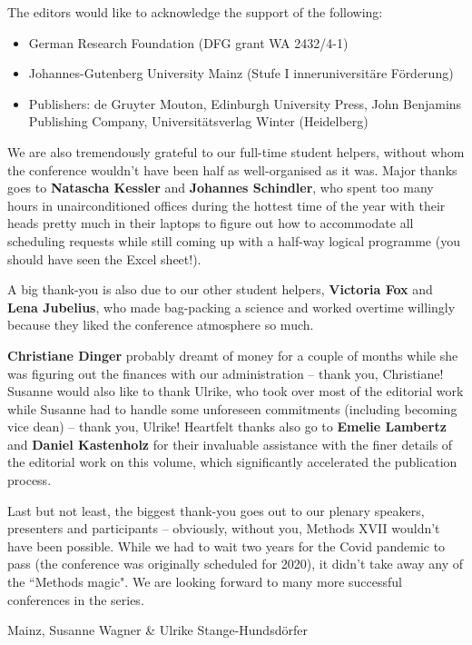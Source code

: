 \addchap{\lsAcknowledgementTitle}
\largerpage[2.75]

The editors would like to acknowledge the support of the following:

\begin{itemize}\itemsep=.5\itemsep
\item German Research Foundation (DFG grant WA 2432/4-1)
\item Johannes-Gutenberg University Mainz (Stufe I inneruniversitäre Förderung)
\item Publishers: de Gruyter Mouton, Edinburgh University Press, John Benjamins Publishing Company, Universitätsverlag Winter (Heidelberg)
\end{itemize}

We are also tremendously grateful to our full-time student helpers, without whom the conference wouldn't have been half as well-organised as it was. Major thanks goes to \textbf{Natascha Kessler} and \textbf{Johannes Schindler}, who spent too many hours in unairconditioned offices during the hottest time of the year with their heads pretty much in their laptops to figure out how to accommodate all scheduling requests while still coming up with a half-way logical programme (you should have seen the Excel sheet!).

A big thank-you is also due to our other student helpers, \textbf{Victoria Fox} and \textbf{Lena Jubelius}, who made bag-packing a science and worked overtime willingly because they liked the conference atmosphere so much. 

\textbf{Christiane Dinger} probably dreamt of money for a couple of months while she was figuring out the finances with our administration – thank you, Christiane! Susanne would also like to thank Ulrike, who took over most of the editorial work while Susanne had to handle some unforeseen commitments (including becoming vice dean) – thank you, Ulrike! Heartfelt thanks also go to \textbf{Emelie Lambertz} and \textbf{Daniel Kastenholz} for their invaluable assistance with the finer details of the editorial work on this volume, which significantly accelerated the publication process.

Last but not least, the biggest thank-you goes out to our plenary speakers, presenters and participants – obviously, without you, Methods XVII wouldn't have been possible. While we had to wait two years for the Covid pandemic to pass (the conference was originally scheduled for 2020), it didn't take away any of the ``Methods magic". We are looking forward to many more successful conferences in the series.

\bigskip
\noindent
Mainz, \monthname{} \the\year{} \hfill Susanne Wagner \& Ulrike Stange-Hundsdörfer
